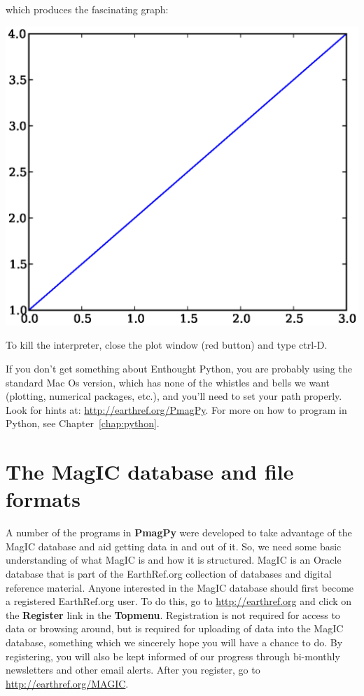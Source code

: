 \documentclass[11pt]{book}
\begin{document}
{\begin{verbatim}
\end{verbatim}

which produces the fascinating graph:

  \includegraphics[width=15cm]{EPSfiles/matplotlib.eps}


To kill the interpreter, close the plot window (red button) and type ctrl-D.  


If you don't get something about Enthought Python, you are probably using the standard Mac Os version, which has none of the whistles and bells we want (plotting, numerical packages, etc.), and you'll need to set your path properly. Look for hints at:
\url{http://earthref.org/PmagPy}.     For more on how to program in Python, see Chapter~\ref{chap:python}.




\chapter{The MagIC database and file formats}

A number of the programs in {\bf PmagPy} were  developed to take advantage of the MagIC database and aid getting data in and out of it.   So, we need some basic understanding of what MagIC is and how it is structured.  
MagIC  is an Oracle  database that is part of the EarthRef.org collection of databases and digital reference material.  
Anyone interested in the MagIC database should first become a registered EarthRef.org user.  To do this, go to \url{http://earthref.org} and click on the {\bf Register} link in the {\bf Topmenu}.   Registration is not required for access to data or browsing around, but is required for uploading of data into the MagIC database, something which we sincerely hope you will have a chance to do.  By registering, you will also be kept informed of our progress through bi-monthly newsletters and other email alerts.    After you register, go to \url{http://earthref.org/MAGIC}.


}
\end{document}
